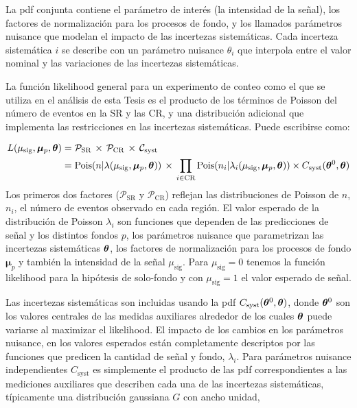 La pdf conjunta contiene el parámetro de interés (la intensidad
de la señal), los factores de normalización para los procesos de fondo, y los
llamados parámetros nuisance que modelan el impacto de las incertezas
sistemáticas. Cada incerteza sistemática $i$ se describe con un parámetro
nuisance $\theta_i$ que interpola entre el valor nominal y las variaciones de
las incertezas sistemáticas.

La función likelihood general para un experimento de conteo como el que se utiliza
en el análisis de esta Tesis es el producto de los términos de Poisson del
número de eventos en la SR y las CR, y una distribución adicional que implementa
las restricciones en las incertezas sistemáticas. Puede escribirse como:

\begin{align}
  L(\mu_\text{sig}, \bm{\mu}_p, \bm{\theta}) &= \mathcal{P}_\text{SR} \, \times \, \mathcal{P}_\text{CR} \, \times \,
  \mathcal{C}_\text{syst} \nonumber \\
  &= \operatorname{Pois}(n|\lambda(\mu_\text{sig}, \bm{\mu}_p, \bm{\theta})) \, \times \, \prod_{i \in \text{CR}}
  \operatorname{Pois}(n_i|\lambda_i(\mu_\text{sig}, \bm{\mu}_p, \bm{\theta})) \times C_\text{syst} (\bm{\theta}^0, \bm{\theta})
\end{align}
%
Los primeros dos factores ($\mathcal{P}_\text{SR}$ y $\mathcal{P}_\text{CR}$)
reflejan las distribuciones de Poisson de $n$, $n_i$, el número de eventos observado
en cada región. El valor esperado de la distribución de Poisson $\lambda_i$ son
funciones que dependen de las predicciones de señal y los distintos fondos $p$,
los parámetros nuisance que parametrizan las incertezas sistemáticas $\bm{\theta}$,
los factores de normalización para los procesos de fondo $\bm{\mu}_p$ y también
la intensidad de la señal $\mu_\text{sig}$. Para $\mu_\text{sig} = 0$ tenemos la
función likelihood para la hipótesis de solo-fondo y con $\mu_\text{sig} = 1$ el
valor esperado de señal. %

Las incertezas sistemáticas son incluidas usando la pdf
$C_\text{syst}(\bm{\theta}^0, \bm{\theta})$, donde $\bm{\theta}^0$ son los valores centrales
de las medidas auxiliares alrededor de los cuales $\bm{\theta}$ puede variarse al
maximizar el likelihood. El impacto de los cambios en los parámetros nuisance,
en los valores esperados están completamente descriptos por las funciones que
predicen la cantidad de señal y fondo, $\lambda_i$. Para parámetros nuisance
independientes $C_\text{syst}$ es simplemente el producto de las pdf
correspondientes a las mediciones auxiliares que describen cada una de las
incertezas sistemáticas, típicamente una distribución gaussiana $G$ con ancho
unidad,

